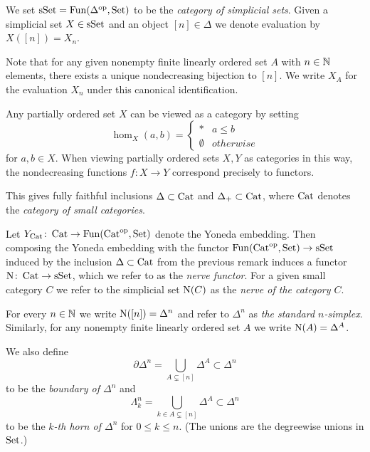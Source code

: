 \begin{definition}\label{def:simpSet}
    We set $\operatorname{sSet}=\operatorname{Fun}(\Delta^{\operatorname{op}},\operatorname{Set})$ to be the \emph{category of simplicial sets}.
    Given a simplicial set $X\in\operatorname{sSet}$ and an object $[n]\in\Delta$ we denote evaluation by $X([n])=X_n$.

    Note that for any given nonempty finite linearly ordered set $A$ with $n\in\mathbb{N}$ elements, there exists a unique nondecreasing bijection to $[n]$.
    We write $X_A$ for the evaluation $X_n$ under this canonical identification. 
\end{definition}
\begin{remark}\label{rmk:linOrderedAsCat}
    Any partially ordered set $X$ can be viewed as a category by setting
    \begin{equation*}
        \hom_{X}(a,b)=\begin{cases}
            * & a\leq b\\
            \emptyset & otherwise
        \end{cases}
    \end{equation*}
    for $a,b\in X$.
    When viewing partially ordered sets $X,Y$ as categories in this way, the nondecreasing functions $f\colon X\to Y$ correspond precisely to functors.

    This gives fully faithful inclusions $\Delta\subset\operatorname{Cat}$ and $\Delta_+\subset\operatorname{Cat}$, where $\operatorname{Cat}$ denotes the \emph{category of small categories}.
\end{remark}
\begin{definition}
    Let $Y_{\operatorname{Cat}}\colon\operatorname{Cat}\to\operatorname{Fun}(\operatorname{Cat}^{\operatorname{op}},\operatorname{Set})$ denote the Yoneda embedding.
    Then composing the Yoneda embedding with the functor $\operatorname{Fun}(\operatorname{Cat}^{\operatorname{op}},\operatorname{Set})\to\operatorname{sSet}$ induced by the inclusion $\Delta\subset\operatorname{Cat}$ from the previous remark induces a functor $\operatorname{N}\colon\operatorname{Cat}\to\operatorname{sSet}$, which we refer to as the \emph{nerve functor}.
    For a given small category $C$ we refer to the simplicial set $\operatorname{N}(C)$ as the \emph{nerve of the category $C$}.
\end{definition}
\begin{definition}
    For every $n\in\mathbb{N}$ we write $\operatorname{N}([n])=\Delta^n$ and refer to $\Delta^n$ as \emph{the standard $n$-simplex}.
    Similarly, for any nonempty finite linearly ordered set $A$ we write $\operatorname{N}(A)=\Delta^A$.

    We also define 
    \begin{equation*}
        \partial\Delta^n=\bigcup\limits_{A\subsetneq[n]}\Delta^A\subset\Delta^n
    \end{equation*}
    to be the \emph{boundary of $\Delta^n$} and 
    \begin{equation*}
        \Lambda_k^n=\bigcup\limits_{k\in A\subsetneq[n]}\Delta^A\subset\Delta^n
    \end{equation*}
    to be the \emph{$k$-th horn of $\Delta^n$} for $0\leq k\leq n$.
    (The unions are the degreewise unions in $\operatorname{Set}$.)
\end{definition}
